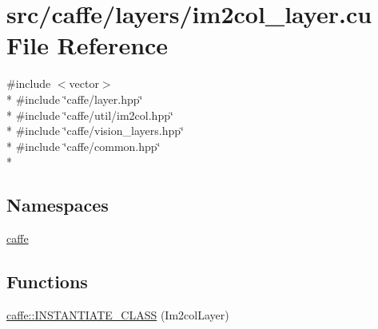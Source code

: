 \hypertarget{im2col__layer_8cu}{\section{src/caffe/layers/im2col\+\_\+layer.cu File Reference}
\label{im2col__layer_8cu}
}
{\ttfamily \#include $<$vector$>$}\\*
{\ttfamily \#include \char`\"{}caffe/layer.\+hpp\char`\"{}}\\*
{\ttfamily \#include \char`\"{}caffe/util/im2col.\+hpp\char`\"{}}\\*
{\ttfamily \#include \char`\"{}caffe/vision\+\_\+layers.\+hpp\char`\"{}}\\*
{\ttfamily \#include \char`\"{}caffe/common.\+hpp\char`\"{}}\\*
\subsection*{Namespaces}
\begin{DoxyCompactItemize}
\item 
 \hyperlink{namespacecaffe}{caffe}
\end{DoxyCompactItemize}
\subsection*{Functions}
\begin{DoxyCompactItemize}
\item 
\hyperlink{namespacecaffe_a3333b145cd7e8fc3ea5bdc1dfce62ae9}{caffe\+::\+I\+N\+S\+T\+A\+N\+T\+I\+A\+T\+E\+\_\+\+C\+L\+A\+S\+S} (Im2col\+Layer)
\end{DoxyCompactItemize}
